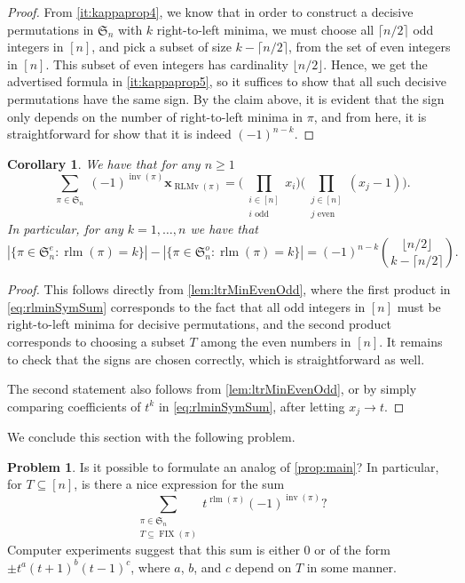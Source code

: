 \documentclass[reqno]{amsart}
\newtheorem{corollary}[theorem]{Corollary}
\theoremstyle{definition}
\newtheorem{problem}[theorem]{Problem}
\newcommand{\xvec}{\mathbf{x}}
\newcommand{\symS}{\mathfrak{S}}
\DeclareMathOperator{\inv}{inv}
\DeclareMathOperator{\FIX}{FIX}
\DeclareMathOperator{\rlm}{rlm}
\DeclareMathOperator{\RLMv}{RLMv}
\begin{document}
\begin{proof}
From \ref{it:kappaprop4}, we know that in order to 
construct a decisive permutations in $\symS_n$ with $k$ right-to-left minima,
we must choose all $\lceil n/2 \rceil$ odd integers in $[n]$,
and pick a subset of size $k  - \lceil n/2 \rceil$,
from the set of even integers in $[n]$.
This subset of even integers has cardinality $\lfloor n/2 \rfloor$.
Hence, we get the advertised formula in 
\ref{it:kappaprop5}, so it suffices to show that all such
decisive permutations have the same sign.
By the claim above, it is evident that 
the sign only depends on the number of right-to-left minima in $\pi$,
and from here, it is straightforward for show that it is indeed
$(-1)^{n-k}$.
\end{proof}


\begin{corollary}\label{cor:rlminsum}
We have that for any $n\geq 1$
\begin{equation}\label{eq:rlminSymSum}
 \sum_{\substack{\pi \in \symS_n   }} (-1)^{\inv(\pi)} \xvec_{\RLMv(\pi)}
 = 
	\big(\prod_{\substack{i \in [n] \\ i \text{ odd}}} x_i\big)
	\big(\prod_{\substack{j \in [n] \\ j \text{ even}}} (x_j-1)\big).
\end{equation}
In particular, for any $k = 1,\dotsc,n$ we have that
\[
 |\{ \pi \in \symS^e_n : \rlm(\pi)=k \}| - 
 |\{ \pi \in \symS^o_n : \rlm(\pi)=k \}| = (-1)^{n-k}
 \binom{ \lfloor n/2 \rfloor }{k - \lceil n/2 \rceil}.
\]
\end{corollary}
\begin{proof}
This follows directly from \cref{lem:ltrMinEvenOdd},
where the first product in \eqref{eq:rlminSymSum}
corresponds to the fact that all odd integers in $[n]$ must be 
right-to-left minima for decisive permutations,
and the second product corresponds to choosing a
subset $T$ among the even numbers in $[n]$.
It remains to check that the signs are chosen correctly,
which is straightforward as well.

The second statement also follows from \cref{lem:ltrMinEvenOdd},
or by simply comparing coefficients of $t^k$ in \eqref{eq:rlminSymSum},
after letting $x_j \to t$.
\end{proof}


We conclude this section with the following problem.
\begin{problem}
Is it possible to formulate an analog of \cref{prop:main}?
In particular, for $T \subseteq [n]$, is there a nice expression for the sum
\[
 \sum_{\substack{\pi \in \symS_n  \\ T \subseteq \FIX(\pi) }} t^{\rlm(\pi)} (-1)^{\inv(\pi)} ?
\]
Computer experiments suggest that this sum is either $0$ or of the form 
$\pm t^a (t+1)^b (t-1)^c$, where $a$, $b$, and $c$ depend on $T$ in some manner.
\end{problem}
\end{document}
